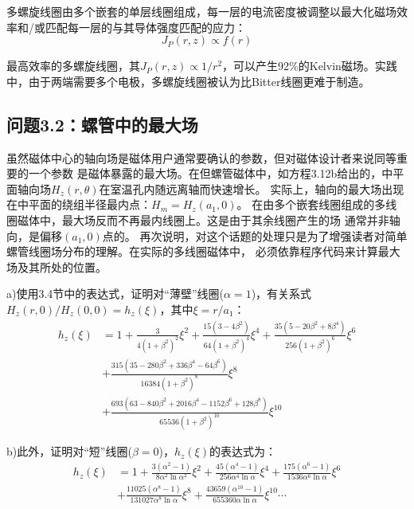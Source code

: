 多螺旋线圈由多个嵌套的单层线圈组成，每一层的电流密度被调整以最大化磁场效率和/或匹配每一层的与其导体强度匹配的应力：
\begin{equation*}
J_P(r,z)\propto f(r)%
\end{equation*}

最高效率的多螺旋线圈，其$J_P(r,z)\propto 1/r^2$，可以产生92\%的Kelvin磁场。实践中，由于两端需要多个电极，多螺旋线圈被认为比Bitter线圈更难于制造。
\newpage


\subsection{问题3.2：螺管中的最大场}
虽然磁体中心的轴向场是磁体用户通常要确认的参数，但对磁体设计者来说同等重要的一个参数
是磁体暴露的最大场。在但螺管磁体中，如方程3.12b给出的，中平面轴向场$H_z(r,
\theta)$在室温孔内随远离轴而快速增长。
实际上，轴向的最大场出现在中平面的绕组半径最内点：$H_m=H_z(a_1,0)$。
在由多个嵌套线圈组成的多线圈磁体中，最大场反而不再最内线圈上。这是由于其余线圈产生的场
通常并非轴向，是偏移$(a_1,0)$点的。
再次说明，对这个话题的处理只是为了增强读者对简单螺管线圈场分布的理解。在实际的多线圈磁体中，
必须依靠程序代码来计算最大场及其所处的位置。

a)使用3.4节中的表达式，证明对“薄壁”线圈($\alpha=1$)，有关系式$H_z(r,0)/H_z(0,0)=h_z(\xi)$，其中$\xi=r/a_1$：
\begin{equation}
\begin{split}
h_z(\xi)&=1+\frac{3}{4(1+\beta^2)^2}\xi^2+\frac{15(3-4\beta^2)}{64(1+\beta^2)^4}\xi^4+\frac{35(5-20\beta^2+8\beta^4)}{256(1+\beta^2)^6}\xi^6\\
&+\frac{315(35-280\beta^2+336\beta^4-64\beta^6)}{16384(1+\beta^2)^8}\xi^8\\
&+\frac{693(63-840\beta^2+2016\beta^4-1152\beta^6+128\beta^8)}{65536(1+\beta^2)^{10}}\xi^{10}%
\end{split}
\end{equation}

b)此外，证明对“短”线圈($\beta=0$)，$h_z(\xi)$的表达式为：
\begin{equation*}
\begin{split}
h_z(\xi)&=1+\frac{3(\alpha^2-1)}{8\alpha^2\ln\alpha^2}\xi^2+\frac{45(\alpha^4-1)}{256\alpha^4\ln\alpha}\xi^4+\frac{175(\alpha^6-1)}{1536\alpha^6\ln\alpha}\xi^6\\
&+\frac{11025(\alpha^8-1)}{131027\alpha^8\ln\alpha}\xi^8+\frac{43659(\alpha^10-1)}{655360\alpha\ln\alpha}\xi^{10}\cdots%
\end{split}\tag{3.117b}
\end{equation*}

